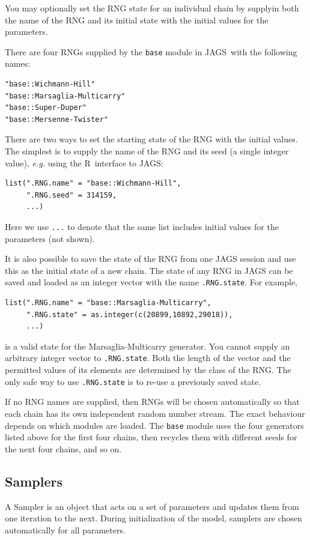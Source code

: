 \documentclass[11pt, a4paper, titlepage]{report}
\newcommand{\JAGS}{\textsf{JAGS}}
\newcommand{\R}{\textsf{R}}
\begin{document}
You may optionally set the RNG state for an individual chain by
supplyin both the name of the RNG and its initial state with the
initial values for the parameters.

There are four RNGs supplied by the \texttt{base} module in \JAGS\
with the following names:
\begin{verbatim}
"base::Wichmann-Hill"
"base::Marsaglia-Multicarry"
"base::Super-Duper"
"base::Mersenne-Twister"
\end{verbatim}

There are two ways to set the starting state of the RNG with the
initial values.  The simplest is to supply the name of the RNG and its
seed (a single integer value), {\em e.g.} using the \R\ interface to
\JAGS:
\begin{verbatim}
list(".RNG.name" = "base::Wichmann-Hill",
     ".RNG.seed" = 314159,
     ...)
\end{verbatim}
Here we use \texttt{...} to denote that the same list includes initial
values for the parameters (not shown).

It is also possible to save the state of the RNG from one JAGS session
and use this as the initial state of a new chain. The state of any RNG
in JAGS can be saved and loaded as an integer vector with the name
\texttt{.RNG.state}. For example,
\begin{verbatim}
list(".RNG.name" = "base::Marsaglia-Multicarry",
     ".RNG.state" = as.integer(c(20899,10892,29018)),
     ...)
\end{verbatim}
is a valid state for the Marsaglia-Multicarry generator.  You cannot
supply an arbitrary integer vector to \texttt{.RNG.state}. Both the
length of the vector and the permitted values of its elements are
determined by the class of the RNG. The only safe way to use
\texttt{.RNG.state} is to re-use a previously saved state.

If no RNG names are supplied, then RNGs will be chosen automatically
so that each chain has its own independent random number stream.  The
exact behaviour depends on which modules are loaded. The \texttt{base}
module uses the four generators listed above for the first four
chains, then recycles them with different seeds for the next four
chains, and so on.  

\subsection{Samplers}

A Sampler is an object that acts on a set of parameters and updates
them from one iteration to the next. During initialization of the
model, samplers are chosen automatically for all parameters.
\end{document}
